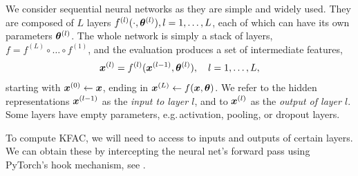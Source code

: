 We consider sequential neural networks as they are simple and widely used.
They are composed of $L$ layers $f^{(l)}(\cdot, {\bm{\theta}}^{(l)}), l=1,\dots, L$, each of which can have its own parameters ${\bm{\theta}}^{(l)}$.
The whole network is simply a stack of layers, \ie $f = f^{(L)} \circ \dots \circ f^{(1)}$, and the evaluation produces a set of intermediate features,
\begin{align*}
  {\bm{x}}^{(l)} = f^{(l)}({\bm{x}}^{(l-1)}, {\bm{\theta}}^{(l)}), \quad l=1,\dots, L,
\end{align*}
starting with ${\bm{x}}^{(0)} \leftarrow {\bm{x}}$, ending in ${\bm{x}}^{(L)} \leftarrow f({\bm{x}}, {\bm{\theta}})$.
We refer to the hidden representations ${\bm{x}}^{(l-1)}$ as the \emph{input to layer $l$}, and to ${\bm{x}}^{(l)}$ as the \emph{output of layer $l$}.
Some layers have empty parameters, e.g.\,activation, pooling, or dropout layers.

To compute KFAC, we will need to access to inputs and outputs of certain layers.
We can obtain these by intercepting the neural net's forward pass using PyTorch's hook mechanism, see .
